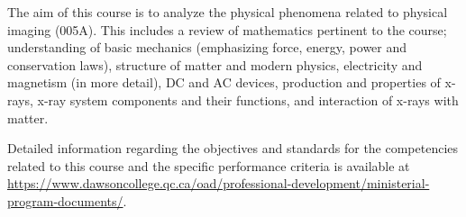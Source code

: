 {The aim of this course is to analyze the physical phenomena related to physical imaging (005A).  This includes a review of mathematics pertinent to the course; understanding of basic mechanics (emphasizing force, energy, power and conservation laws), structure of matter and modern physics, electricity and magnetism (in more detail), DC and AC devices, production and properties of x-rays, x-ray system components and their functions, and interaction of x-rays with matter.
\smallskip

Detailed information regarding the objectives and standards for the competencies related to this course and the specific performance criteria is available at \url{https://www.dawsoncollege.qc.ca/oad/professional-development/ministerial-program-documents/}.}